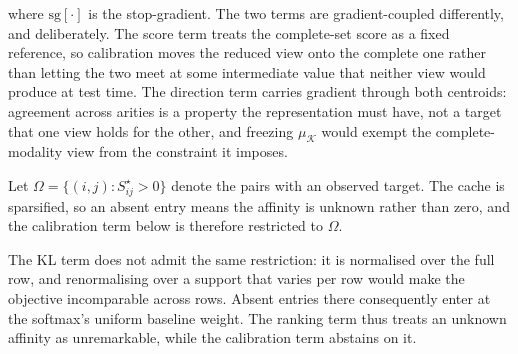 where $\mathrm{sg}[\cdot]$ is the stop-gradient. The two terms are
gradient-coupled differently, and deliberately. The score term treats the
complete-set score as a fixed reference, so calibration moves the reduced
view onto the complete one rather than letting the two meet at some
intermediate value that neither view would produce at test time. The
direction term carries gradient through both centroids: agreement across
arities is a property the representation must have, not a target that one
view holds for the other, and freezing $\mu_{\mathcal{K}}$ would exempt
the complete-modality view from the constraint it imposes.


%
%


Let $\Omega = \{(i,j) : S^{\star}_{ij} > 0\}$ denote the pairs with an
observed target. The cache is sparsified, so an absent entry means the
affinity is unknown rather than zero, and the calibration term below is
therefore restricted to $\Omega$.


The KL term does not admit the same restriction: it is normalised over
the full row, and renormalising over a support that varies per row would
make the objective incomparable across rows. Absent entries there
consequently enter at the softmax's uniform baseline weight. The ranking
term thus treats an unknown affinity as unremarkable, while the
calibration term abstains on it.


